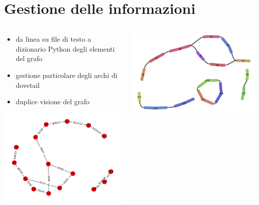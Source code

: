 \documentclass{beamer}
\begin{document}

\section{Gestione delle informazioni}
\begin{frame}{\secname}
	\begin{columns}
		\begin{column}{0.5\textwidth}
			\begin{itemize}
				\item da linea su file di testo a dizionario Python degli elementi del grafo
				\item gestione particolare degli archi di dovetail
				\item duplice visione del grafo
			\end{itemize}
			\includegraphics[scale=0.35]{matplot-es}
		\end{column}
		\begin{column}{0.5\textwidth}
			\centering
			\includegraphics[scale=0.35]{bandage-es}
		\end{column}
	\end{columns}
\end{frame}
\end{document}
